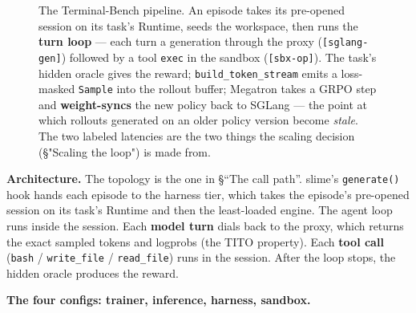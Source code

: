 \documentclass[
  paper=a4,
  ,captions=tableheading
]{scrartcl}
\begin{document}
\begin{figure}[htbp]
{%
}
\caption{The Terminal-Bench pipeline. An episode takes its pre-opened session on its task's Runtime, seeds the workspace, then runs the \textbf{turn loop} --- each turn a generation through the proxy (\texttt{[sglang-gen]}) followed by a tool \texttt{exec} in the sandbox (\texttt{[sbx-op]}). The task's hidden oracle gives the reward; \texttt{build\_token\_stream} emits a loss-masked \texttt{Sample} into the rollout buffer; Megatron takes a GRPO step and \textbf{weight-syncs} the new policy back to SGLang --- the point at which rollouts generated on an older policy version become \emph{stale}. The two labeled latencies are the two things the scaling decision (§"Scaling the loop") is made from.}
\end{figure}

\textbf{Architecture.} The topology is the one in §``The call path''.
slime's \texttt{generate()} hook hands each episode to the harness tier,
which takes the episode's pre-opened session on its task's Runtime and
then the least-loaded engine. The agent loop runs inside the session.
Each \textbf{model turn} dials back to the proxy, which returns the
exact sampled tokens and logprobs (the TITO property). Each \textbf{tool
call} (\texttt{bash} / \texttt{write\_file} / \texttt{read\_file}) runs
in the session. After the loop stops, the hidden oracle produces the
reward.

\textbf{The four configs: trainer, inference, harness, sandbox.}
\end{document}
